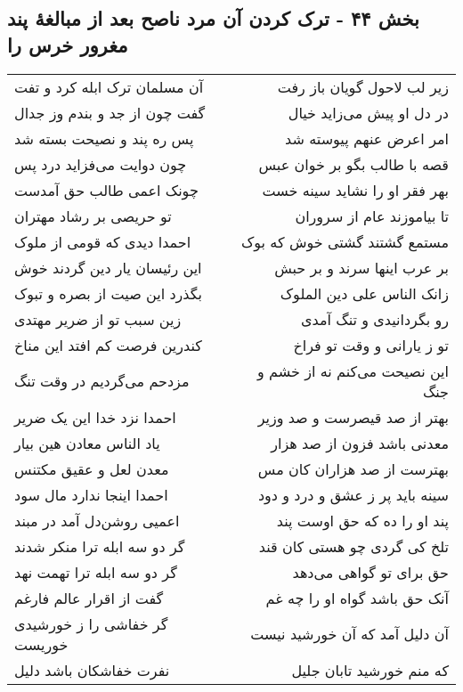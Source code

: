 \begin{center}
\section*{بخش ۴۴ - ترک کردن آن مرد ناصح بعد از مبالغهٔ پند مغرور خرس را}
\label{sec:sh044}
\begin{longtable}{l p{0.5cm} r}
آن مسلمان ترک ابله کرد و تفت
&&
زیر لب لاحول گویان باز رفت
\\
گفت چون از جد و بندم وز جدال
&&
در دل او پیش می‌زاید خیال
\\
پس ره پند و نصیحت بسته شد
&&
امر اعرض عنهم پیوسته شد
\\
چون دوایت می‌فزاید درد پس
&&
قصه با طالب بگو بر خوان عبس
\\
چونک اعمی طالب حق آمدست
&&
بهر فقر او را نشاید سینه خست
\\
تو حریصی بر رشاد مهتران
&&
تا بیاموزند عام از سروران
\\
احمدا دیدی که قومی از ملوک
&&
مستمع گشتند گشتی خوش که بوک
\\
این رئیسان یار دین گردند خوش
&&
بر عرب اینها سرند و بر حبش
\\
بگذرد این صیت از بصره و تبوک
&&
زانک الناس علی دین الملوک
\\
زین سبب تو از ضریر مهتدی
&&
رو بگردانیدی و تنگ آمدی
\\
کندرین فرصت کم افتد این مناخ
&&
تو ز یارانی و وقت تو فراخ
\\
مزدحم می‌گردیم در وقت تنگ
&&
این نصیحت می‌کنم نه از خشم و جنگ
\\
احمدا نزد خدا این یک ضریر
&&
بهتر از صد قیصرست و صد وزیر
\\
یاد الناس معادن هین بیار
&&
معدنی باشد فزون از صد هزار
\\
معدن لعل و عقیق مکتنس
&&
بهترست از صد هزاران کان مس
\\
احمدا اینجا ندارد مال سود
&&
سینه باید پر ز عشق و درد و دود
\\
اعمیی روشن‌دل آمد در مبند
&&
پند او را ده که حق اوست پند
\\
گر دو سه ابله ترا منکر شدند
&&
تلخ کی گردی چو هستی کان قند
\\
گر دو سه ابله ترا تهمت نهد
&&
حق برای تو گواهی می‌دهد
\\
گفت از اقرار عالم فارغم
&&
آنک حق باشد گواه او را چه غم
\\
گر خفاشی را ز خورشیدی خوریست
&&
آن دلیل آمد که آن خورشید نیست
\\
نفرت خفاشکان باشد دلیل
&&
که منم خورشید تابان جلیل
\\

\end{longtable}
\end{center}
